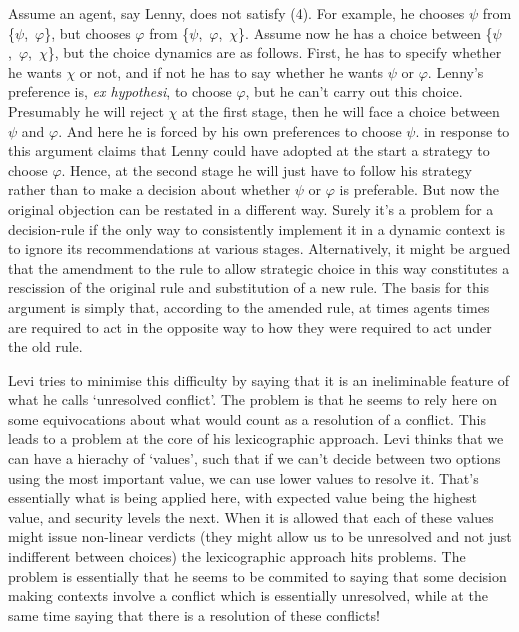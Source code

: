 Assume an agent, say Lenny, does not satisfy (4). For example, he
chooses $\psi$ from \{$\psi$,~$\varphi$\}, but chooses $\varphi$ from \{$\psi$,~$\varphi$,~$\chi$\}. Assume now he
has a choice between \{$\psi$,~$\varphi$,~$\chi$\}, but the choice dynamics are as
follows. First, he has to specify whether he wants $\chi$ or not, and if not
he has to say whether he wants $\psi$ or $\varphi$. Lenny's preference is, \emph{ex
hypothesi}, to choose $\varphi$, but he can't carry out this choice. Presumably
he will reject $\chi$ at the first stage, then he will face a choice between
$\psi$ and $\varphi$. And here he is forced by his own preferences to choose $\psi$. \citet{Levi1987} in response to this argument claims that Lenny could have adopted
at the start a strategy to choose $\varphi$. Hence, at the second stage he will
just have to follow his strategy rather than to make a decision about
whether $\psi$ or $\varphi$ is preferable. But now the original objection can be
restated in a different way. Surely it's a problem for a decision-rule
if the only way to consistently implement it in a dynamic context is to
ignore its recommendations at various stages. Alternatively, it might be
argued that the amendment to the rule to allow strategic choice in this
way constitutes a rescission of the original rule and substitution of a
new rule. The basis for this argument is simply that, according to the
amended rule, at times agents times are required to act in the opposite
way to how they were required to act under the old rule.

Levi tries to minimise this difficulty by saying that it is an
ineliminable feature of what he calls `unresolved conflict'. The problem
is that he seems to rely here on some equivocations about what would
count as a resolution of a conflict. This leads to a problem at the core
of his lexicographic approach. Levi thinks that we can have a hierachy
of `values', such that if we can't decide between two options using the
most important value, we can use lower values to resolve it. That's
essentially what is being applied here, with expected value being the
highest value, and security levels the next. When it is allowed that
each of these values might issue non-linear verdicts (they might allow
us to be unresolved and not just indifferent between choices) the
lexicographic approach hits problems. The problem is essentially that he
seems to be commited to saying that some decision making contexts
involve a conflict which is essentially unresolved, while at the same
time saying that there is a resolution of these conflicts!

